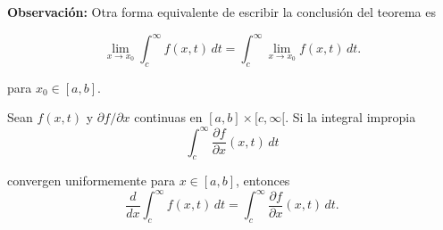     \textbf{Observación:} Otra forma equivalente de escribir la conclusión del teorema es
 \begin{shaded}
    $$\lim_{x\to x_0} \int_c^{\infty} f(x,t)\,dt = \int_c^{\infty} \lim_{x\to x_0} f(x,t) \,dt.$$
\end{shaded}

para $x_0 \in [a,b]$.

\begin{teorema}
    Sean $f(x,t)$ y $\partial f/\partial x$ continuas en $[a, b] \times [c, \infty[$. Si la integral impropia
    $$\int_c^{\infty} \frac{\partial f}{\partial x}(x,t) \,dt$$

    convergen uniformemente para $x \in [a,b]$, entonces 
    $$\frac{d}{dx} \int_c^{\infty} f(x,t) \,dt = \int_c^{\infty} \frac{\partial f}{\partial x}(x,t) \,dt.$$
\end{teorema}

